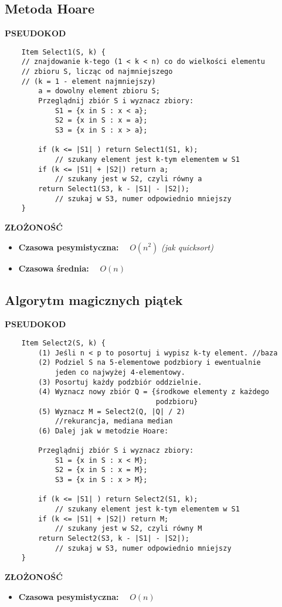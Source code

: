 \documentclass[../algorytmy.tex]{subfiles}
\begin{document}
\subsection{Metoda Hoare}

    \textbf{PSEUDOKOD}
    \begin{verbatim}
    Item Select1(S, k) {
    // znajdowanie k-tego (1 < k < n) co do wielkości elementu
    // zbioru S, licząc od najmniejszego
    // (k = 1 - element najmniejszy)
        a = dowolny element zbioru S;
        Przeglądnij zbiór S i wyznacz zbiory:
            S1 = {x in S : x < a};
            S2 = {x in S : x = a};
            S3 = {x in S : x > a};

        if (k <= |S1| ) return Select1(S1, k);
            // szukany element jest k-tym elementem w S1
        if (k <= |S1| + |S2|) return a;
            // szukany jest w S2, czyli równy a
        return Select1(S3, k - |S1| - |S2|);
            // szukaj w S3, numer odpowiednio mniejszy
    }
   \end{verbatim}

    \textbf{ZŁOŻONOŚĆ}
    \begin{itemize}
        \item \textbf{Czasowa pesymistyczna:} ~~$O(n^2)$ \textit{(jak quicksort)}
        \item \textbf{Czasowa średnia:} ~~$O(n)$
    \end{itemize}

\pagebreak

\subsection{Algorytm magicznych piątek}

    \textbf{PSEUDOKOD}
    \begin{verbatim}
    Item Select2(S, k) {
        (1) Jeśli n < p to posortuj i wypisz k-ty element. //baza
        (2) Podziel S na 5-elementowe podzbiory i ewentualnie
            jeden co najwyżej 4-elementowy.
        (3) Posortuj każdy podzbiór oddzielnie.
        (4) Wyznacz nowy zbiór Q = {środkowe elementy z każdego
                                    podzbioru}
        (5) Wyznacz M = Select2(Q, |Q| / 2)
            //rekurancja, mediana median
        (6) Dalej jak w metodzie Hoare:

        Przeglądnij zbiór S i wyznacz zbiory:
            S1 = {x in S : x < M};
            S2 = {x in S : x = M};
            S3 = {x in S : x > M};

        if (k <= |S1| ) return Select2(S1, k);
            // szukany element jest k-tym elementem w S1
        if (k <= |S1| + |S2|) return M;
            // szukany jest w S2, czyli równy M
        return Select2(S3, k - |S1| - |S2|);
            // szukaj w S3, numer odpowiednio mniejszy
    }
   \end{verbatim}

    \textbf{ZŁOŻONOŚĆ}
    \begin{itemize}
        \item \textbf{Czasowa pesymistyczna:} ~~$O(n)$
    \end{itemize}
\end{document}
